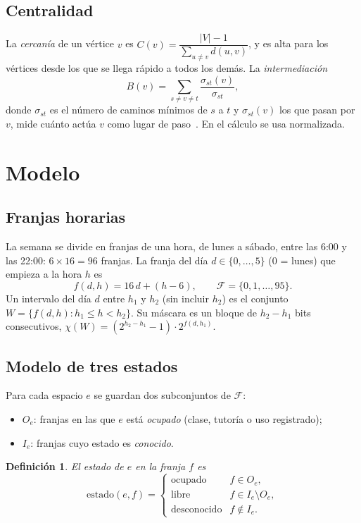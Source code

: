\documentclass[conference,a4paper]{IEEEtran}
\newtheorem{definicion}{Definición}
\newcommand{\F}{\mathcal{F}}
\begin{document}
\subsection{Centralidad}
La \emph{cercanía} de un vértice $v$ es
$C(v)=\dfrac{|V|-1}{\sum_{u\neq v} d(u,v)}$, y es alta para los vértices desde los que
se llega rápido a todos los demás. La \emph{intermediación}
\[
  B(v)=\sum_{s\neq v\neq t}\frac{\sigma_{st}(v)}{\sigma_{st}},
\]
donde $\sigma_{st}$ es el número de caminos mínimos de $s$ a $t$ y $\sigma_{st}(v)$
los que pasan por $v$, mide cuánto actúa $v$ como lugar de paso~\cite{freeman}. En el
cálculo se usa normalizada.

\section{Modelo}

\subsection{Franjas horarias}
La semana se divide en franjas de una hora, de lunes a sábado, entre las 6:00 y las
22:00: $6\times16=96$ franjas. La franja del día $d\in\{0,\dots,5\}$ (0 = lunes) que
empieza a la hora $h$ es
\[
  f(d,h) = 16\,d + (h-6), \qquad \F=\{0,1,\dots,95\}.
\]
Un intervalo del día $d$ entre $h_1$ y $h_2$ (sin incluir $h_2$) es el conjunto
$W=\{f(d,h): h_1\le h<h_2\}$. Su máscara es un bloque de $h_2-h_1$ bits consecutivos,
$\chi(W) = (2^{h_2-h_1}-1)\cdot 2^{f(d,h_1)}$.

\subsection{Modelo de tres estados}
Para cada espacio $e$ se guardan dos subconjuntos de $\F$:
\begin{itemize}
  \item $O_e$: franjas en las que $e$ está \emph{ocupado} (clase, tutoría o uso
  registrado);
  \item $I_e$: franjas cuyo estado es \emph{conocido}.
\end{itemize}

\begin{definicion}
El estado de $e$ en la franja $f$ es
\[
\text{estado}(e,f)=\begin{cases}
\text{ocupado} & f\in O_e,\\
\text{libre} & f\in I_e\setminus O_e,\\
\text{desconocido} & f\notin I_e.
\end{cases}
\]
\end{definicion}
\end{document}
